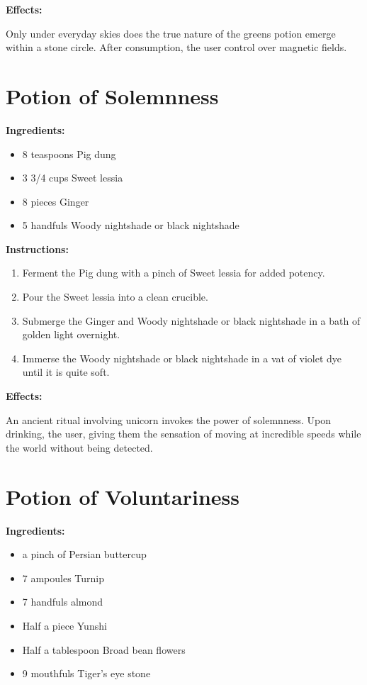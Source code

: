 \documentclass{article}
\begin{document}
\textbf{Effects:}

Only under everyday skies does the true nature of the greens potion emerge within a stone circle. After consumption, the user control over magnetic fields.

\newpage
\section*{Potion of Solemnness}

\textbf{Ingredients:}

\begin{itemize}
  \item 8 teaspoons Pig dung
  \item 3 3/4 cups Sweet lessia
  \item 8 pieces Ginger
  \item 5 handfuls Woody nightshade or black nightshade
\end{itemize}

\textbf{Instructions:}

\begin{enumerate}
  \item Ferment the Pig dung with a pinch of Sweet lessia for added potency.
  \item Pour the Sweet lessia into a clean crucible.
  \item Submerge the Ginger and Woody nightshade or black nightshade in a bath of golden light overnight.
  \item Immerse the Woody nightshade or black nightshade in a vat of violet dye until it is quite soft.
\end{enumerate}

\textbf{Effects:}

An ancient ritual involving unicorn invokes the power of solemnness. Upon drinking, the user, giving them the sensation of moving at incredible speeds while the world without being detected.

\newpage
\section*{Potion of Voluntariness}

\textbf{Ingredients:}

\begin{itemize}
  \item a pinch of Persian buttercup
  \item 7 ampoules Turnip
  \item 7 handfuls almond
  \item Half a piece Yunshi
  \item Half a tablespoon Broad bean flowers
  \item 9 mouthfuls Tiger's eye stone
\end{itemize}
\end{document}
